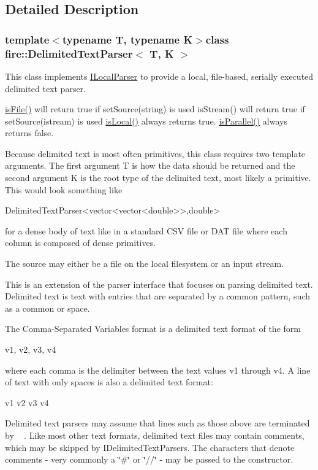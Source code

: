 \subsection{Detailed Description}
\subsubsection*{template$<$typename T, typename K$>$class fire\+::\+Delimited\+Text\+Parser$<$ T, K $>$}

This class implements \hyperlink{a00019}{I\+Local\+Parser} to provide a local, file-\/based, serially executed delimited text parser.

\hyperlink{a00019_a091d5cf56bf8f407854ef87f460b2958}{is\+File()} will return true if set\+Source(string) is used is\+Stream() will return true if set\+Source(istream) is used \hyperlink{a00019_a770acae6e216de3a9c7140a12de25d58}{is\+Local()} always returns true. \hyperlink{a00019_ad46898c516adcce38acbb4800dc9777b}{is\+Parallel()} always returns false.

Because delimited text is most often primitives, this class requires two template arguments. The first argument T is how the data should be returned and the second argument K is the root type of the delimited text, most likely a primitive. This would look something like


\begin{DoxyCode}
DelimitedTextParser<vector<vector<double>>,\textcolor{keywordtype}{double}>
\end{DoxyCode}


for a dense body of text like in a standard C\+S\+V file or D\+A\+T file where each column is composed of dense primitives.

The source may either be a file on the local filesystem or an input stream.

This is an extension of the parser interface that focuses on parsing delimited text. Delimited text is text with entries that are separated by a common pattern, such as a common or space.

The Comma-\/\+Separated Variables format is a delimited text format of the form

v1, v2, v3, v4

where each comma is the delimiter between the text values v1 through v4. A line of text with only spaces is also a delimited text format\+:

v1 v2 v3 v4

Delimited text parsers may assume that lines such as those above are terminated by ~\newline
. Like most other text formats, delimited text files may contain comments, which may be skipped by I\+Delimited\+Text\+Parsers. The characters that denote comments -\/ very commonly a \char`\"{}\#\char`\"{} or \char`\"{}//\char`\"{} -\/ may be passed to the constructor. 

